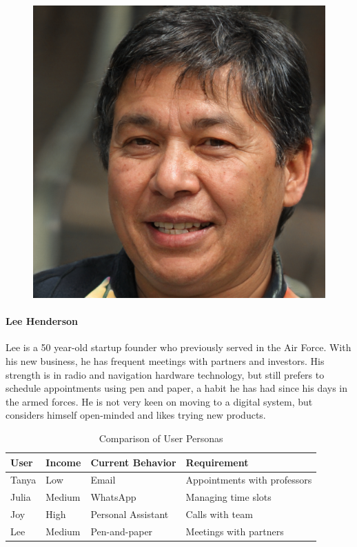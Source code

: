 \documentclass{article}
\begin{document}
\begin{figure}
	\includegraphics[scale=0.08]{persona-lee.jpg}
\end{figure}

\paragraph{Lee Henderson}

Lee is a 50 year-old startup founder who previously served in the Air Force. With his new business, he has frequent meetings with partners and investors.  His strength is in radio and navigation hardware technology, but still prefers to schedule appointments using pen and paper, a habit he has had since his days in the armed forces. He is not very keen on moving to a digital system, but considers himself open-minded and likes trying new products.

\begin{table}[!htb]
	\begin{minipage}{1\linewidth}
		\caption{Comparison of User Personas}
		\centering
		\begin{tabular}{llll}
			\hline
			\textbf{User} & \textbf{Income} & \textbf{Current Behavior} & \textbf{Requirement}         \\
			\hline
			Tanya         & Low             & Email & Appointments with professors \\
			Julia         & Medium          & WhatsApp & Managing time slots          \\
			Joy           & High            & Personal Assistant & Calls with team              \\
			Lee           & Medium          & Pen-and-paper & Meetings with partners       \\
			\hline
		\end{tabular}
	\end{minipage}%
\end{table}
\end{document}
